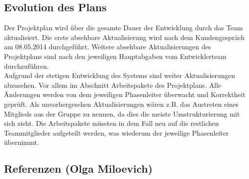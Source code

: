 \documentclass[fontsize=12pt,paper=a4,twoside]{scrartcl}
\begin{document}
\subsection{Evolution des Plans}

Der Projektplan wird über die gesamte Dauer der Entwicklung durch das Team aktualisiert. Die erste absehbare Aktualisierung wird nach dem Kundengespräch am 08.05.2014 durchgeführt. Weitere absehbare Aktualisierungen des Projektplans sind nach den jeweiligen Hauptabgaben vom Entwicklerteam durchzuführen. \\
Aufgrund der stetigen Entwicklung des Systems sind weiter Aktualisierungen abzusehen. Vor allem im Abschnitt Arbeitspakete des Projektplans. Alle Änderungen werden von dem jeweiligen Phasenleiter überwacht und Korrektheit geprüft. Als unvorhergesehen Aktualisierungen wären z.B. das Austreten eines Mitglieds aus der Gruppe zu nennen, da dies die meiste Umstrukturierung mit sich zieht. Die Arbeitspakete müssten in dem Fall neu auf die restlichen Teammitglieder aufgeteilt werden, was wiederum der jeweilige Phasenleiter übernimmt.


\subsection{Referenzen (Olga Miloevich)}\label{referenzen}
\end{document}
